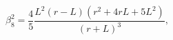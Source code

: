 \begin{equation}
\beta_8^{2}=\frac{4}{5}\frac{L^2(r-L)(r^2+4rL+5L^2)}{(r+L)^3}\label{beta2},
\end{equation}

